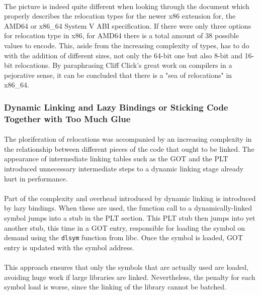 \documentclass[12pt]{article}
\begin{document}
	\paragraph{}The picture is indeed quite different when looking through the document which properly describes the relocation types for the newer x86 extension for, the AMD64 or x86\_64 System V ABI specification\cite{x86_64-abi-spec}. If there were only three options for relocation type in x86, for AMD64 there is a total amount of 38 possible values to encode. This, aside from the increasing complexity of types, has to do with the addition of different sizes, not only the 64-bit one but also 8-bit and 16-bit relocations. By paraphrasing Cliff Click's great work on compilers\cite{sea-of-nodes} in a pejorative sense, it can be concluded that there is a "sea of relocations" in x86\_64.
	
	\subsubsection{Dynamic Linking and Lazy Bindings or Sticking Code Together with Too Much Glue}
	
	\paragraph{}The ploriferation of relocations was accompanied by an increasing complexity in the relationship between different pieces of the code that ought to be linked. The appearance of intermediate linking tables such as the \acrshort{GOT} and the \acrshort{PLT} introduced unnecessary intermediate steps to a dynamic linking stage already hurt in performance.
	
	\paragraph{}Part of the complexity and overhead introduced by dynamic linking is introduced by lazy bindings\cite{lazy-bindings}. When these are used, the function call to a dynamically-linked symbol jumps into a stub in the \acrshort{PLT} section. This \acrshort{PLT} stub then jumps into yet another stub, this time in a \acrshort{GOT} entry, responsible for loading the symbol on demand using the \verb|dlsym| function from libc. Once the symbol is loaded, \acrshort{GOT} entry is updated with the symbol address.
	\paragraph{}This approach ensures that only the symbols that are actually used are loaded, avoiding huge work if large libraries are linked. Nevertheless, the penalty for each symbol load is worse, since the linking of the library cannot be batched.
\end{document}
